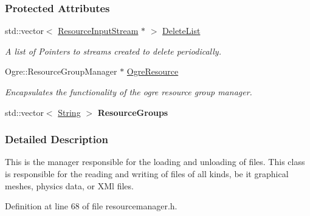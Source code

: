 \subsubsection*{Protected Attributes}
\begin{DoxyCompactItemize}
\item 
\hypertarget{classphys_1_1ResourceManager_a03a283e02f3639f5c1f2de915ed798ae}{
std::vector$<$ \hyperlink{classphys_1_1ResourceInputStream}{ResourceInputStream} $\ast$ $>$ \hyperlink{classphys_1_1ResourceManager_a03a283e02f3639f5c1f2de915ed798ae}{DeleteList}}
\label{classphys_1_1ResourceManager_a03a283e02f3639f5c1f2de915ed798ae}

\begin{DoxyCompactList}\small\item\em A list of Pointers to streams created to delete periodically. \item\end{DoxyCompactList}\item 
\hypertarget{classphys_1_1ResourceManager_af19bf0549a0896cf84696a39f4ca817d}{
Ogre::ResourceGroupManager $\ast$ \hyperlink{classphys_1_1ResourceManager_af19bf0549a0896cf84696a39f4ca817d}{OgreResource}}
\label{classphys_1_1ResourceManager_af19bf0549a0896cf84696a39f4ca817d}

\begin{DoxyCompactList}\small\item\em Encapsulates the functionality of the ogre resource group manager. \item\end{DoxyCompactList}\item 
\hypertarget{classphys_1_1ResourceManager_a284bc8b042fffbb607355f7874692b54}{
std::vector$<$ \hyperlink{namespacephys_aa03900411993de7fbfec4789bc1d392e}{String} $>$ {\bfseries ResourceGroups}}
\label{classphys_1_1ResourceManager_a284bc8b042fffbb607355f7874692b54}

\end{DoxyCompactItemize}


\subsubsection{Detailed Description}
This is the manager responsible for the loading and unloading of files. This class is responsible for the reading and writing of files of all kinds, be it graphical meshes, physics data, or XMl files. 

Definition at line 68 of file resourcemanager.h.



